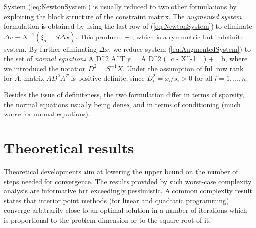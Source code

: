 System (\ref{eq:NewtonSystem}) is usually reduced to two other
formulations by exploiting the block structure of the constraint
matrix.
%
The {\em augmented system} formulation is obtained by using 
the last row of (\ref{eq:NewtonSystem}) to eliminate
$\Delta s = X^{-1} (\xi_\mu - S\Delta x)$.
This produces
%
\be \label{eq:AugmentedSystem}
\left[ \begin{array}{cc}
    -X^{-1}S & A^T \\ A & 0
  \end{array} \right]
 =
\left[ \begin{array}{c}
    \xi_c - X^{-1}\xi_\mu \\ \xi_b
   \end{array} \right],
\ee
which is a symmetric but indefinite system.
%
By further eliminating $\Delta x$, we reduce system 
(\ref{eq:AugmentedSystem}) to the set of {\em normal equations}
%
\be \label{eq:NormalEquations}
  A D^2 A^T \Delta y = A D^2 (\xi_c - X^{-1} \xi_\mu) + \xi_b,
\ee
%
where we introduced the notation $D^2 = S^{-1} X$.
Under the assumption of full row rank for $A$, matrix 
$A D^2 A^T$ is positive definite, since $D^2_i = x_i/s_i > 0$ for
all $i = 1, \ldots, n$.

Besides the issue of definiteness, the two formulation differ in
terms of sparsity, the normal equations usually being dense, and
in terms of conditioning (much worse for normal equations).




%
%
\section{Theoretical results}
\label{sec:TheoreticalResults}

Theoretical developments aim at lowering the upper bound on the number 
of steps needed for convergence. The results provided by such worst-case 
complexity analysis
are informative but exceedingly pessimistic. A common complexity result 
states that interior point methods (for linear and quadratic programming) 
converge arbitrarily close to an optimal solution in a number of iterations 
which is proportional to the problem dimension or to the square root of it.

